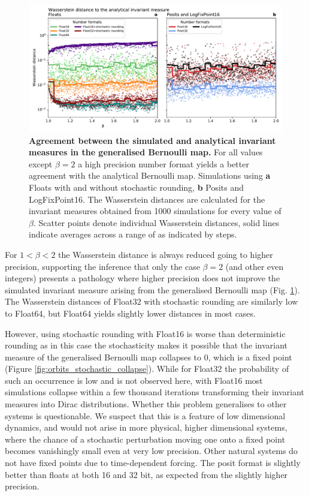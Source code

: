 \begin{figure}[tbhp]
	\includegraphics[width=1\textwidth]{Figures/orbits/wasserstein.pdf}
	\caption{\textbf{Agreement between the simulated and analytical invariant measures in the generalised
	Bernoulli map.} For all values except $\beta = 2$ a high precision number format yields a better agreement
	with the analytical Bernoulli map. Simulations using \textbf{a} Floats with and without stochastic rounding, 
	\textbf{b} Posits and LogFixPoint16. The Wasserstein distances are calculated for the invariant measures
	obtained from 1000 simulations for every value of $\beta$. Scatter points denote individual Wasserstein
	distances, solid lines indicate averages across a range of  as indicated by steps.}
	\label{fig:orbits_wasserstein}
\end{figure}

For $1<\beta<2$  the Wasserstein distance is always reduced going to higher precision, supporting the inference that only the case $\beta=2$
(and other even integers) presents a pathology where higher precision does not improve the simulated invariant measure arising from the
generalised Bernoulli map (Fig. \ref{fig:orbits_wasserstein}). The Wasserstein distances of Float32 with stochastic rounding are similarly low
to Float64, but Float64 yields slightly lower distances in most cases.

However, using stochastic rounding with Float16 is worse than deterministic rounding as in this case the stochasticity makes it possible that the
invariant measure of the generalised Bernoulli map collapses to 0, which is a fixed point (Figure \ref{fig:orbits_stochastic_collapse}).
While for Float32 the probability of such an occurrence is low and is not observed here, with Float16 most simulations collapse within
a few thousand iterations transforming their invariant measures into Dirac distributions. Whether this problem generalises to other
systems is questionable. We suspect that this is a feature of low dimensional dynamics, and would not arise in more physical,
higher dimensional systems, where the chance of a stochastic perturbation moving one onto a fixed point becomes vanishingly
small even at very low precision. Other natural systems do not have fixed points due to time-dependent forcing. The posit format
is slightly better than floats at both 16 and 32 bit, as expected from the slightly higher precision.

